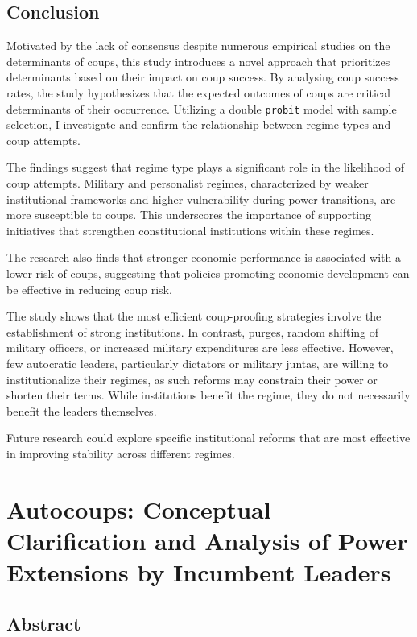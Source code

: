 \documentclass[
  12pt,
]{report}
\begin{document}
\section{Conclusion}\label{conclusion}

Motivated by the lack of consensus despite numerous empirical studies on
the determinants of coups, this study introduces a novel approach that
prioritizes determinants based on their impact on coup success. By
analysing coup success rates, the study hypothesizes that the expected
outcomes of coups are critical determinants of their occurrence.
Utilizing a double \texttt{probit} model with sample selection, I
investigate and confirm the relationship between regime types and coup
attempts.

The findings suggest that regime type plays a significant role in the
likelihood of coup attempts. Military and personalist regimes,
characterized by weaker institutional frameworks and higher
vulnerability during power transitions, are more susceptible to coups.
This underscores the importance of supporting initiatives that
strengthen constitutional institutions within these regimes.

The research also finds that stronger economic performance is associated
with a lower risk of coups, suggesting that policies promoting economic
development can be effective in reducing coup risk.

The study shows that the most efficient coup-proofing strategies involve
the establishment of strong institutions. In contrast, purges, random
shifting of military officers, or increased military expenditures are
less effective. However, few autocratic leaders, particularly dictators
or military juntas, are willing to institutionalize their regimes, as
such reforms may constrain their power or shorten their terms. While
institutions benefit the regime, they do not necessarily benefit the
leaders themselves.

Future research could explore specific institutional reforms that are
most effective in improving stability across different regimes.

\chapter{Autocoups: Conceptual Clarification and Analysis of Power
Extensions by Incumbent
Leaders}\label{autocoups-conceptual-clarification-and-analysis-of-power-extensions-by-incumbent-leaders}

\section*{Abstract}\label{abstract-1}
\end{document}
